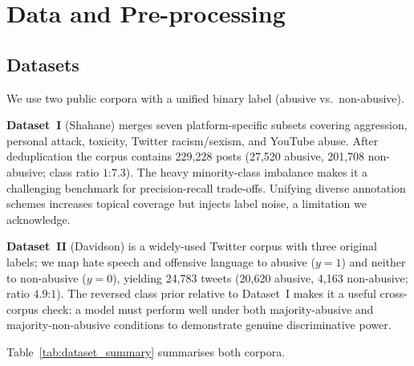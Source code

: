 \documentclass[10pt,twocolumn,a4paper]{article}
\begin{document}
\section{Data and Pre-processing}\label{sec:data}

\subsection{Datasets}\label{subsec:datasets}

We use two public corpora with a unified binary label (abusive vs.\ non-abusive).

\textbf{Dataset~I} (Shahane) \citep{ref10} merges seven platform-specific subsets covering aggression, personal attack, toxicity, Twitter racism/sexism, and YouTube abuse. After deduplication the corpus contains 229,228 posts (27,520 abusive, 201,708 non-abusive; class ratio $1$:$7.3$). The heavy minority-class imbalance makes it a challenging benchmark for precision-recall trade-offs. Unifying diverse annotation schemes increases topical coverage but injects label noise, a limitation we acknowledge.

\textbf{Dataset~II} (Davidson) \citep{ref11} is a widely-used Twitter corpus with three original labels; we map hate speech and offensive language to abusive ($y=1$) and neither to non-abusive ($y=0$), yielding 24,783 tweets (20,620 abusive, 4,163 non-abusive; ratio $4.9$:$1$). The reversed class prior relative to Dataset~I makes it a useful cross-corpus check: a model must perform well under both majority-abusive and majority-non-abusive conditions to demonstrate genuine discriminative power.

Table~\ref{tab:dataset_summary} summarises both corpora.

\begin{table}[!t]
\caption{Dataset statistics.}
\label{tab:dataset_summary}
\centering
{}
\end{table}
\end{document}
